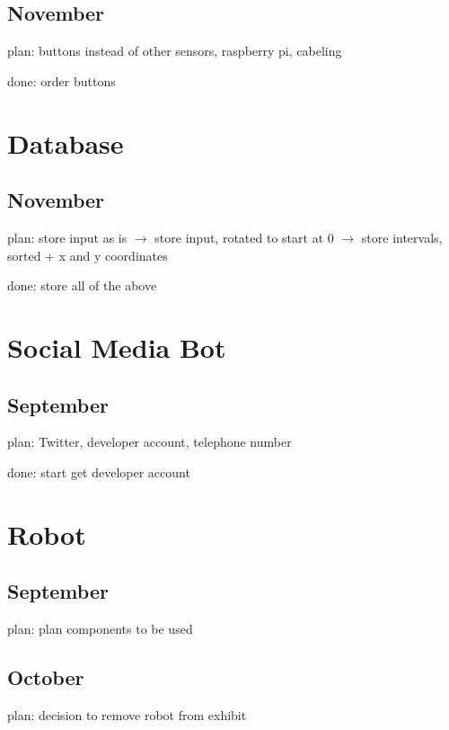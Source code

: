 \documentclass[a4paper]{scrartcl}
\begin{document}
\subsection{November}
plan: buttons instead of other sensors, raspberry pi, cabeling

\noindent
done: order buttons

\section{Database}
\subsection{November}
plan: store input as is $\rightarrow$ store input, rotated to start at 0 $\rightarrow$ store intervals, sorted + x and y coordinates

\noindent
done: store all of the above

\section{Social Media Bot}
\subsection{September}
plan: Twitter, developer account, telephone number

\noindent
done: start get developer account

\section{Robot}
\subsection{September}
plan: plan components to be used

\subsection{October}
plan: decision to remove robot from exhibit
\end{document}
